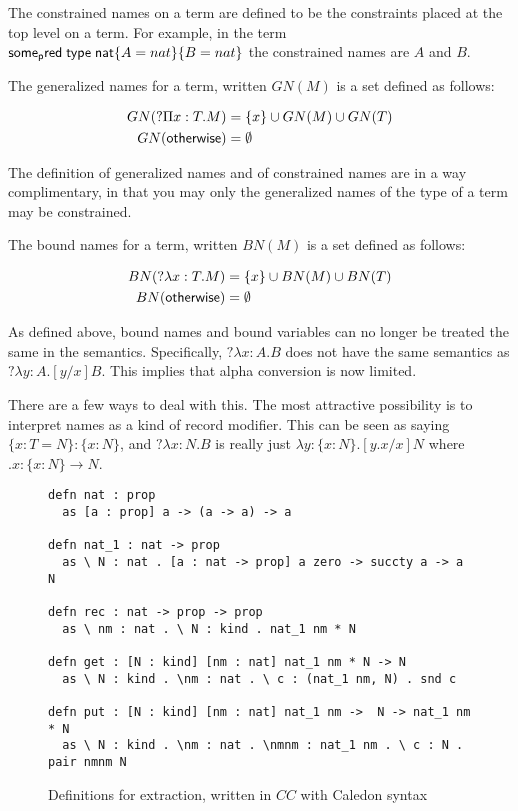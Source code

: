 The constrained names on a term are defined to be the constraints placed at the top level on 
a term.  For example, in the term $\mathsf{some_pred} \; \mathsf{type} \; \mathsf{nat} \{ A = nat \} \{ B = nat \}$ the constrained names are $A$ and $B$.  

\begin{definition}
The generalized names for a term, written $GN(M)$ is a set defined as follows:

\begin{align}
GN(?\Pi x : T . M) &= \{ x \} \cup GN(M) \cup GN(T)
\\
GN(\mathsf{otherwise}) &= \emptyset
\end{align}
\end{definition}

The definition of generalized names and of constrained names are in a way complimentary, in that
you may only the generalized names of the type of a term may be constrained.

\begin{definition}
The bound names for a term, written $BN(M)$ is a set defined as follows:

\begin{align} 
BN(?\lambda x : T . M) &= \{ x \} \cup BN(M) \cup BN(T)
\\
BN(\mathsf{otherwise}) &= \emptyset
\end{align}

\end{definition}

As defined above, bound names and bound variables can no longer be treated the same in the semantics.  
Specifically, $?\lambda x : A . B$ does not have the same semantics as $?\lambda y : A . [y / x] B$.  
This implies that alpha conversion is now limited.  

There are a few ways to deal with this.  
The most attractive possibility is to interpret names as a kind of record modifier.
This can be seen as saying $\{ x : T = N \} : \{ x : N \}$, 
and $?\lambda x : N . B$ is really just $\lambda y : \{ x : N \} . [ y.x / x ] N$ where $ .x : \{ x : N \} \rightarrow N$.

\begin{figure}[H]
\begin{lstlisting}
defn nat : prop 
  as [a : prop] a -> (a -> a) -> a

defn nat_1 : nat -> prop
  as \ N : nat . [a : nat -> prop] a zero -> succty a -> a N

defn rec : nat -> prop -> prop
  as \ nm : nat . \ N : kind . nat_1 nm * N

defn get : [N : kind] [nm : nat] nat_1 nm * N -> N
  as \ N : kind . \nm : nat . \ c : (nat_1 nm, N) . snd c

defn put : [N : kind] [nm : nat] nat_1 nm ->  N -> nat_1 nm * N
  as \ N : kind . \nm : nat . \nmnm : nat_1 nm . \ c : N . pair nmnm N
\end{lstlisting}
\caption{Definitions for extraction, written in $CC$ with Caledon syntax}
\label{code:ideal}
\end{figure}

